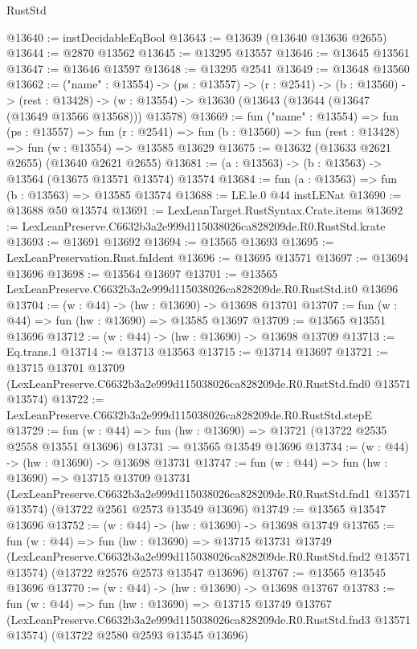 \begin{lexlean}{RustStd}
\begin{coremodule}
@13640 := instDecidableEqBool
@13643 := @13639 (@13640 @13636 @2655)
@13644 := @2870 @13562
@13645 := @13295 @13557
@13646 := @13645 @13561
@13647 := @13646 @13597
@13648 := @13295 @2541
@13649 := @13648 @13560
@13662 := ("name" : @13554) ->
  (ps : @13557) ->
  (r : @2541) ->
  (b : @13560) ->
  (rest : @13428) -> (w : @13554) -> @13630 (@13643 (@13644 (@13647 (@13649 @13566 @13568))) @13578)
@13669 := fun ("name" : @13554) =>
  fun (ps : @13557) =>
  fun (r : @2541) => fun (b : @13560) => fun (rest : @13428) => fun (w : @13554) => @13585 @13629
@13675 := @13632 (@13633 @2621 @2655) (@13640 @2621 @2655)
@13681 := (a : @13563) -> (b : @13563) -> @13564 (@13675 @13571 @13574) @13574
@13684 := fun (a : @13563) => fun (b : @13563) => @13585 @13574
@13688 := LE.le.{0} @44 instLENat
@13690 := @13688 @50 @13574
@13691 := LexLeanTarget.RustSyntax.Crate.items
@13692 := LexLeanPreserve.C6632b3a2e999d115038026ca828209de.R0.RustStd.krate
@13693 := @13691 @13692
@13694 := @13565 @13693
@13695 := LexLeanPreservation.Rust.fnIdent
@13696 := @13695 @13571
@13697 := @13694 @13696
@13698 := @13564 @13697
@13701 := @13565 LexLeanPreserve.C6632b3a2e999d115038026ca828209de.R0.RustStd.it0 @13696
@13704 := (w : @44) -> (hw : @13690) -> @13698 @13701
@13707 := fun (w : @44) => fun (hw : @13690) => @13585 @13697
@13709 := @13565 @13551 @13696
@13712 := (w : @44) -> (hw : @13690) -> @13698 @13709
@13713 := Eq.trans.{1}
@13714 := @13713 @13563
@13715 := @13714 @13697
@13721 := @13715
    @13701
    @13709
    (LexLeanPreserve.C6632b3a2e999d115038026ca828209de.R0.RustStd.fnd0 @13571 @13574)
@13722 := LexLeanPreserve.C6632b3a2e999d115038026ca828209de.R0.RustStd.stepE
@13729 := fun (w : @44) => fun (hw : @13690) => @13721 (@13722 @2535 @2558 @13551 @13696)
@13731 := @13565 @13549 @13696
@13734 := (w : @44) -> (hw : @13690) -> @13698 @13731
@13747 := fun (w : @44) =>
  fun (hw : @13690) =>
  @13715
    @13709
    @13731
    (LexLeanPreserve.C6632b3a2e999d115038026ca828209de.R0.RustStd.fnd1 @13571 @13574)
    (@13722 @2561 @2573 @13549 @13696)
@13749 := @13565 @13547 @13696
@13752 := (w : @44) -> (hw : @13690) -> @13698 @13749
@13765 := fun (w : @44) =>
  fun (hw : @13690) =>
  @13715
    @13731
    @13749
    (LexLeanPreserve.C6632b3a2e999d115038026ca828209de.R0.RustStd.fnd2 @13571 @13574)
    (@13722 @2576 @2573 @13547 @13696)
@13767 := @13565 @13545 @13696
@13770 := (w : @44) -> (hw : @13690) -> @13698 @13767
@13783 := fun (w : @44) =>
  fun (hw : @13690) =>
  @13715
    @13749
    @13767
    (LexLeanPreserve.C6632b3a2e999d115038026ca828209de.R0.RustStd.fnd3 @13571 @13574)
    (@13722 @2580 @2593 @13545 @13696)

\end{coremodule}
\end{lexlean}
